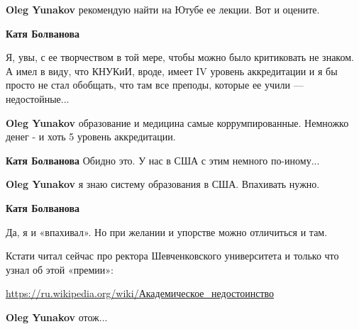 \begin{itemize}
\begin{itemize}

\textbf{Oleg Yunakov} рекомендую найти на Ютубе ее лекции. Вот и оцените.


\textbf{Катя Болванова} 

Я, увы, с ее творчеством в той мере, чтобы можно было
критиковать не знаком. А имел в виду, что КНУКиИ, вроде, имеет IV уровень
аккредитации и я бы просто не стал обобщать, что там все преподы, которые ее
учили — недостойные...


\textbf{Oleg Yunakov} образование и медицина самые коррумпированные. Немножко денег - и хоть 5 уровень аккредитации.


\textbf{Катя Болванова} Обидно это. У нас в США с этим немного по-иному...


\textbf{Oleg Yunakov} я знаю систему образования в США. Впахивать нужно.


\textbf{Катя Болванова} 

Да, я и «впахивал». Но при желании и упорстве можно отличиться и там. 

Кстати читал сейчас про ректора Шевченковского университета и только что узнал об этой «премии»: 

\url{https://ru.wikipedia.org/wiki/Академическое_недостоинство}


\textbf{Oleg Yunakov} отож...

\end{itemize}



\end{itemize}
